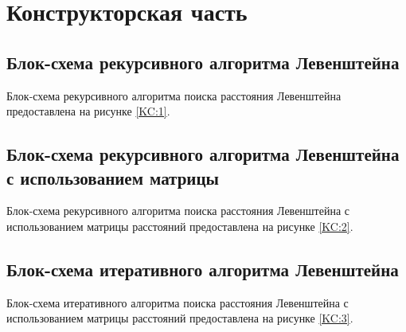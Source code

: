 \documentclass[12pt]{report}
\begin{document}
\newpage

\chapter{Конструкторская часть}
\section{Блок-схема рекурсивного алгоритма Левенштейна}
Блок-схема рекурсивного алгоритма поиска расстояния Левенштейна предоставлена на рисунке \ref{KC:1}.
\section{Блок-схема рекурсивного алгоритма Левенштейна с использованием матрицы}
Блок-схема рекурсивного алгоритма поиска расстояния Левенштейна с использованием матрицы расстояний предоставлена на рисунке \ref{KC:2}.
\section{Блок-схема итеративного алгоритма Левенштейна}
Блок-схема итеративного алгоритма поиска расстояния Левенштейна с использованием матрицы расстояний предоставлена на рисунке \ref{KC:3}.
\end{document}
